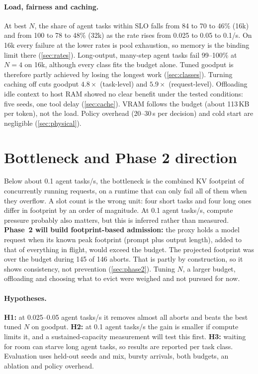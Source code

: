 \documentclass[10pt,twocolumn]{article}
\begin{document}
\paragraph{Load, fairness and caching.} At best $N$, the share of agent tasks within SLO falls from 84 to 70 to 46\% (16k) and from 100 to 78 to 48\% (32k) as the rate rises from 0.025 to 0.05 to 0.1/s. On 16k every failure at the lower rates is pool exhaustion, so memory is the binding limit there (\cref{sec:rates}). Long-output, many-step agent tasks fail 99--100\% at $N{=}4$ on 16k, although every class fits the budget alone. Tuned goodput is therefore partly achieved by losing the longest work (\cref{sec:classes}). Turning caching off cuts goodput $4.8\times$ (task-level) and $5.9\times$ (request-level). Offloading idle context to host RAM showed no clear benefit under the tested conditions: five seeds, one tool delay (\cref{sec:cache}). VRAM follows the budget (about 113\,KB per token), not the load. Policy overhead (20--30\,\textmu s per decision) and cold start are negligible (\cref{sec:physical}).

\section{Bottleneck and Phase 2 direction}\label{main:phase2}

Below about 0.1 agent tasks/s, the bottleneck is the combined KV footprint of concurrently running requests, on a runtime that can only fail all of them when they overflow. A slot count is the wrong unit: four short tasks and four long ones differ in footprint by an order of magnitude. At 0.1 agent tasks/s, compute pressure probably also matters, but this is inferred rather than measured. \textbf{Phase~2 will build footprint-based admission:} the proxy holds a model request when its known peak footprint (prompt plus output length), added to that of everything in flight, would exceed the budget. The projected footprint was over the budget during 145 of 146 aborts. That is partly by construction, so it shows consistency, not prevention (\cref{sec:phase2}). Tuning $N$, a larger budget, offloading and choosing what to evict were weighed and not pursued for now.

\paragraph{Hypotheses.} \textbf{H1:} at 0.025--0.05 agent tasks/s it removes almost all aborts and beats the best tuned $N$ on goodput. \textbf{H2:} at 0.1 agent tasks/s the gain is smaller if compute limits it, and a sustained-capacity measurement will test this first. \textbf{H3:} waiting for room can starve long agent tasks, so results are reported per task class. Evaluation uses held-out seeds and mix, bursty arrivals, both budgets, an ablation and policy overhead.
\end{document}
